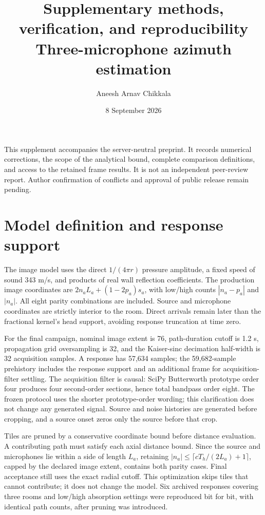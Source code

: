 \documentclass[10pt,a4paper]{article}
\title{Supplementary methods, verification, and reproducibility\\\large Three-microphone azimuth estimation}
\author{Aneesh Arnav Chikkala}
\date{8 September 2026}
\begin{document}
\maketitle
\noindent This supplement accompanies the server-neutral preprint. It records numerical corrections, the scope of the analytical bound, complete comparison definitions, and access to the retained frame results. It is not an independent peer-review report. Author confirmation of conflicts and approval of public release remain pending.

\section{Model definition and response support}
The image model uses the direct $1/(4\pi r)$ pressure amplitude, a fixed speed of sound 343 m/s, and products of real wall reflection coefficients. The production image coordinates are $2n_aL_a+(1-2p_a)s_a$, with low/high counts $|n_a-p_a|$ and $|n_a|$. All eight parity combinations are included. Source and microphone coordinates are strictly interior to the room. Direct arrivals remain later than the fractional kernel's head support, avoiding response truncation at time zero.

For the final campaign, nominal image extent is 76, path-duration cutoff is 1.2 s, propagation grid oversampling is 32, and the Kaiser-sinc decimation half-width is 32 acquisition samples. A response has 57,634 samples; the 59,682-sample prehistory includes the response support and an additional frame for acquisition-filter settling. The acquisition filter is causal: SciPy Butterworth prototype order four produces four second-order sections, hence total bandpass order eight. The frozen protocol uses the shorter prototype-order wording; this clarification does not change any generated signal. Source and noise histories are generated before cropping, and a source onset zeros only the source before that crop.

Tiles are pruned by a conservative coordinate bound before distance evaluation. A contributing path must satisfy each axial distance bound. Since the source and microphones lie within a side of length $L_a$, retaining $|n_a|\leq\lceil cT_h/(2L_a)+1\rceil$, capped by the declared image extent, contains both parity cases. Final acceptance still uses the exact radial cutoff. This optimization skips tiles that cannot contribute; it does not change the model. Six archived responses covering three rooms and low/high absorption settings were reproduced bit for bit, with identical path counts, after pruning was introduced.
\end{document}
